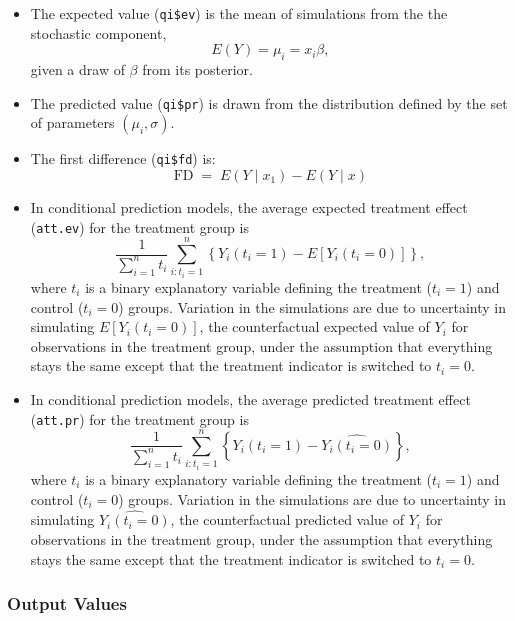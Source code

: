 \begin{itemize}
\item The expected value ({\tt qi\$ev}) is the mean of simulations
  from the the stochastic component, $$E(Y) = \mu_i = x_i \beta,$$
  given a draw of $\beta$ from its posterior.  

\item The predicted value ({\tt qi\$pr}) is drawn from the distribution
  defined by the set of parameters $(\mu_i, \sigma)$.  

\item The first difference ({\tt qi\$fd}) is:
\begin{equation*}
\textrm{FD}\; = \;E(Y \mid x_1) -  E(Y \mid x)
\end{equation*}

\item In conditional prediction models, the average expected treatment
  effect ({\tt att.ev}) for the treatment group is 
    \begin{equation*} \frac{1}{\sum_{i=1}^n t_i}\sum_{i:t_i=1}^n \left\{ Y_i(t_i=1) -
      E[Y_i(t_i=0)] \right\},
    \end{equation*} 
    where $t_i$ is a binary explanatory variable defining the treatment
    ($t_i=1$) and control ($t_i=0$) groups.  Variation in the
    simulations are due to uncertainty in simulating $E[Y_i(t_i=0)]$,
    the counterfactual expected value of $Y_i$ for observations in the
    treatment group, under the assumption that everything stays the
    same except that the treatment indicator is switched to $t_i=0$.

\item In conditional prediction models, the average predicted treatment
  effect ({\tt att.pr}) for the treatment group is 
    \begin{equation*} \frac{1}{\sum_{i=1}^n t_i}\sum_{i:t_i=1}^n \left\{ Y_i(t_i=1) -
      \widehat{Y_i(t_i=0)} \right\},
    \end{equation*} 
    where $t_i$ is a binary explanatory variable defining the
    treatment ($t_i=1$) and control ($t_i=0$) groups.  Variation in
    the simulations are due to uncertainty in simulating
    $\widehat{Y_i(t_i=0)}$, the counterfactual predicted value of
    $Y_i$ for observations in the treatment group, under the
    assumption that everything stays the same except that the
    treatment indicator is switched to $t_i=0$.

\end{itemize}

\subsubsection{Output Values}

